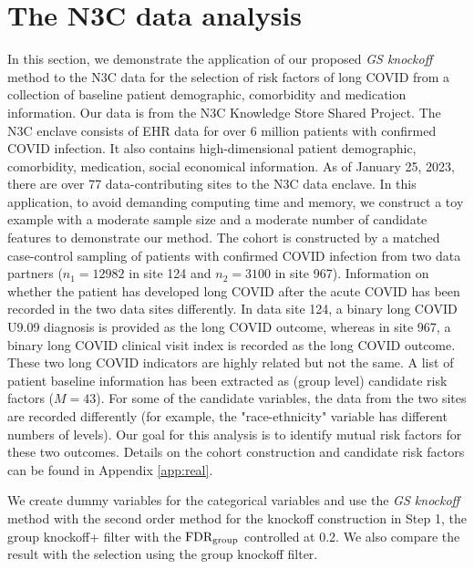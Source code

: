 \documentclass[11pt]{article}
\theoremstyle{plain}
\theoremstyle{definition}
\theoremstyle{remark}
\newcommand{\0}{\mathbf{0}}
\newcommand{\fdr}{\textnormal{FDR}}
\newcommand{\gfdr}{\fdr_{\textnormal{group}}}
\begin{document}
\section{The N3C data analysis}
In this section, we demonstrate the application of our proposed \textit{GS knockoff} method to the N3C data for the selection of risk factors of long COVID from a collection of baseline patient demographic, comorbidity and medication information. Our data is from the N3C Knowledge Store Shared Project. The N3C enclave consists of EHR data for over 6 million patients with confirmed COVID infection. It also contains high-dimensional patient demographic, comorbidity, medication, social economical information. As of January 25, 2023, there are over 77 data-contributing sites to the N3C data enclave. In this application, to avoid demanding computing time and memory, we construct a toy example with a moderate sample size and a moderate number of candidate features to demonstrate our method. The cohort is constructed by a matched case-control sampling of patients with confirmed COVID infection from two data partners ($n_1 = 12982$ in site 124 and $n_2=3100$ in site 967). Information on whether the patient has developed long COVID after the acute COVID has been recorded in the two data sites differently. In data site 124, a binary long COVID U9.09 diagnosis is provided as the long COVID outcome, whereas in site 967, a binary long COVID clinical visit index is recorded as the long COVID outcome. These two long COVID indicators are highly related but not the same. A list of patient baseline information has been extracted as (group level) candidate risk factors ($M = 43$). For some of the candidate variables, the data from the two sites are recorded differently (for example, the "race-ethnicity" variable has different numbers of levels). Our goal for this analysis is to identify mutual risk factors for these two outcomes. Details on the cohort construction and candidate risk factors can be found in Appendix \ref{app:real}. 

We create dummy variables for the categorical variables and use the \textit{GS knockoff} method with the second order method for the knockoff construction in Step 1, the group knockoff+ filter with the $\gfdr$ controlled at 0.2. We also compare the result with the selection using the group knockoff filter. 
\end{document}
